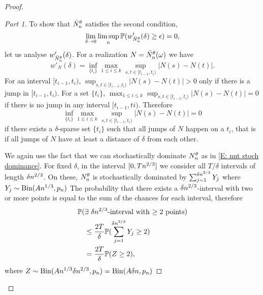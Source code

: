 \begin{proof}
\begin{proof}[Part 1]
\bigskip

To show that $\bar{N}_n^{\theta}$ satisfies the second condition,
\begin{equation} \label{E: tightness cond 2}
\lim_{\delta \rightarrow 0} \limsup_n \mathbb{P}(w'_{\bar{N}_n^{\theta}}(\delta) \geq \epsilon ) = 0,
\end{equation}
let us analyse $w'_{\bar{N}_n^{\theta}}(\delta)$.
For a realization $N = \bar{N}_n^{\theta}(\omega)$ we have
\begin{equation}
w'_{N}(\delta) = \inf_{\{t_i\}} \max_{1\leq i \leq k} \sup_{s,t \in [t_{i-1}, t_i)} |N(s) - N(t)|.
\end{equation}
For an interval $[t_{i-1}, t_i)$, 
$\sup_{s,t \in [t_{i-1}, t_i)} |N(s) - N(t)| > 0$ only if there is a jump in $[t_{i-1}, t_i)$.
For a set $\{t_i\}$, $\max_{1\leq i \leq k} \sup_{s,t \in [t_{i-1}, t_i)} |N(s) - N(t)| = 0$ if there is no jump in any interval $[t_{i-1}, ti)$.
Therefore
\begin{equation}
\inf_{\{t_i\}} \max_{1\leq i \leq k} \sup_{s,t \in [t_{i-1}, t_i)} |N(s) - N(t)| = 0
\end{equation}
if there exists a $\delta$-sparse set $\{t_i\}$ such that all jumps of $N$ happen on a $t_i$,
that is if all jumps of $N$ have at least a distance of $\delta$ from each other.

We again use the fact that we can stochastically dominate $N_n^{\theta}$ as in \eqref{E: nnt stoch dominance}.
For fixed $\delta$, in the interval $[0, Tn^{2 / 3}]$ we consider all $T/\delta$ intervals of length $\delta n^{2 / 3}$.
On these, $N_n^{\theta}$ is stochastically dominated by $\sum_{j = 1}^{\delta n^{2 / 3}} Y_j$ where $Y_j \sim \operatorname*{Bin}(An^{1 / 3}, p_n)$
The probability that there exists a $\delta n^{2 / 3}$-interval with two or more points is equal to the sum of the chances for each interval,
therefore
\begin{equation}
\begin{aligned}
&\mathbb{P}( \text{$\exists$ $\delta n^{2 / 3}$-interval with $\geq 2$ points} ) \\
&\quad\leq \frac{2T}{\delta} \mathbb{P}( \sum_{j = 1}^{\delta n^{2 / 3}} Y_j \geq 2 ) \\
&\quad=  \frac{2T}{\delta} \mathbb{P}( Z \geq 2 ),
\end{aligned}
\end{equation}
where $Z \sim \operatorname*{Bin}(An^{1 / 3}\delta n^{2 / 3}, p_n) = \operatorname*{Bin}(A\delta n, p_n)$


\end{proof}
\end{proof}
